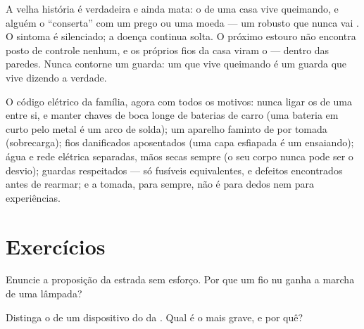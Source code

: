 \begin{remark}\label{rem:g7:short-circuits-safety:nail}
A velha história é verdadeira e ainda mata: o  de uma casa
vive queimando, e alguém o ``conserta'' com um prego ou uma moeda ---
um  robusto que nunca vai . O sintoma é silenciado; a
doença continua solta. O próximo estouro não encontra posto de
controle nenhum, e os próprios fios da casa viram o  --- dentro
das paredes. Nunca contorne um guarda: um  que vive queimando
é um guarda que vive dizendo a verdade.
\end{remark}

\begin{remark}\label{rem:g7:short-circuits-safety:rules}
O código elétrico da família, agora com todos os motivos: nunca ligar
os  de uma  entre si, e manter chaves de boca longe de
baterias de carro (uma bateria em curto pelo metal é um arco de
solda); um aparelho faminto de  por tomada (sobrecarga); fios
danificados aposentados (uma capa esfiapada é um 
ensaiando); água e rede elétrica separadas, mãos secas sempre (o seu
corpo nunca pode ser o desvio); guardas respeitados --- só fusíveis
equivalentes, e defeitos encontrados antes de rearmar; e a tomada,
para sempre, não é para dedos nem para experiências.
\end{remark}

\section{Exercícios}

\begin{exercise}[$\star$]\label{exo:g7:short-circuits-safety:1}
Enuncie a proposição da estrada sem esforço. Por que um fio nu ganha
a marcha de uma lâmpada?
\end{exercise}

\begin{exercise}[$\star$]\label{exo:g7:short-circuits-safety:2}
Distinga o  de um dispositivo do  da
. Qual é o mais grave, e por quê?
\end{exercise}

